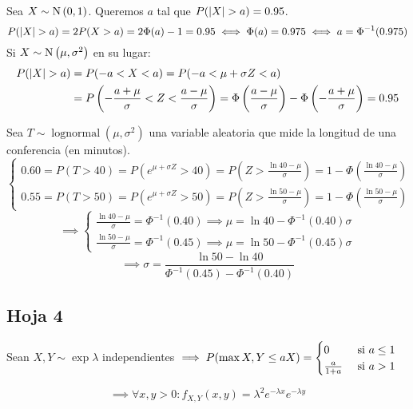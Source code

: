  Sea $X\sim\operatorname{N}\left(0,1\right)$. Queremos $a$ tal que $P(\left|X\right| > a) = 0.95$.
\[P(\left|X\right| > a) = 2P(X > a) = 2\Phi(a) -1 = 0.95 \iff \Phi(a) = 0.975 \iff a = \Phi^{-1}(0.975)\]
Si $X\sim\operatorname{N}\left(\mu, \sigma^2\right)$ en su lugar:
\[\begin{aligned}
		P(\left|X\right| > a) & = P(-a<X<a) = P(-a < \mu + \sigma Z < a)                                                                                                                 \\
		               & = P\left(-\frac{a+\mu}{\sigma} < Z < \frac{a-\mu}{\sigma}\right) = \Phi\left(\frac{a-\mu}{\sigma}\right) - \Phi\left(-\frac{a+\mu}{\sigma}\right) = 0.95
	\end{aligned}\]

 Sea $T\sim\operatorname{lognormal}(\mu, \sigma^2)$ una variable aleatoria que mide la longitud de una conferencia (en minutos).
\[\begin{cases}
		0.60 = P(T > 40) = P(e^{\mu + \sigma Z} > 40) = P\left(Z > \frac{\ln{40}-\mu}{\sigma}\right) = 1 - \Phi\left(\frac{\ln{40}-\mu}{\sigma}\right) \\
		0.55 = P(T > 50) = P(e^{\mu + \sigma Z} > 50) = P\left(Z > \frac{\ln{50}-\mu}{\sigma}\right) = 1 - \Phi\left(\frac{\ln{50}-\mu}{\sigma}\right)
	\end{cases}\]
\[\implies \begin{cases}
		\frac{\ln{40}-\mu}{\sigma} = \Phi^{-1}(0.40) \implies \mu = \ln{40} - \Phi^{-1}(0.40)\sigma \\
		\frac{\ln{50}-\mu}{\sigma} = \Phi^{-1}(0.45) \implies \mu = \ln{50} - \Phi^{-1}(0.45)\sigma
	\end{cases}\]
\[\implies \sigma = \frac{\ln{50}-\ln{40}}{\Phi^{-1}(0.45)-\Phi^{-1}(0.40)}\]

\subsection{Hoja 4}

 Sean $X, Y \sim \exp{\lambda}$ independientes $\displaystyle \implies P(\max{X, Y} \leq aX) = \begin{cases}
		0             & \text{ si } a \leq 1 \\
		\frac{a}{1+a} & \text{ si } a > 1
	\end{cases}$
\begin{dem}
	\[\implies \forall x, y > 0 : f_{X, Y} (x, y) = \lambda^2 e^{-\lambda x} e^{-\lambda y}\]
\end{dem}

